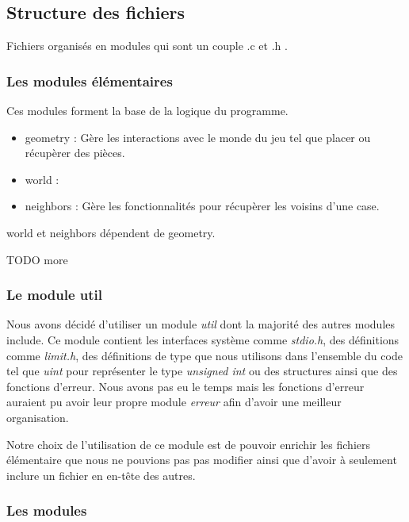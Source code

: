 \subsection{Structure des fichiers}

Fichiers organisés en modules qui sont un couple .c et .h .  

\subsubsection{Les modules élémentaires}

Ces modules forment la base de la logique du programme. 

\begin{itemize}
    \item geometry : Gère les interactions avec le monde du jeu tel que placer ou récupèrer des pièces.
    \item world : 
    \item neighbors : Gère les fonctionnalités pour récupèrer les voisins d'une case.
\end{itemize}

world et neighbors dépendent de geometry.

TODO more

\subsubsection{Le module util}

Nous avons décidé d'utiliser un module \emph{util} dont la majorité des autres modules include. 
Ce module contient les interfaces système comme \emph{stdio.h}, des définitions comme \emph{limit.h},
des définitions de type que nous utilisons dans l'ensemble du code tel que \emph{uint} pour représenter
le type \emph{unsigned int} ou des structures ainsi que des fonctions d'erreur. Nous avons pas eu le temps
mais les fonctions d'erreur auraient pu avoir leur propre module \emph{erreur} afin d'avoir une meilleur organisation.

Notre choix de l'utilisation de ce module est de pouvoir enrichir les fichiers élémentaire que nous ne pouvions pas
pas modifier ainsi que d'avoir à seulement inclure un fichier en en-tête des autres.  


\subsubsection{Les modules}

